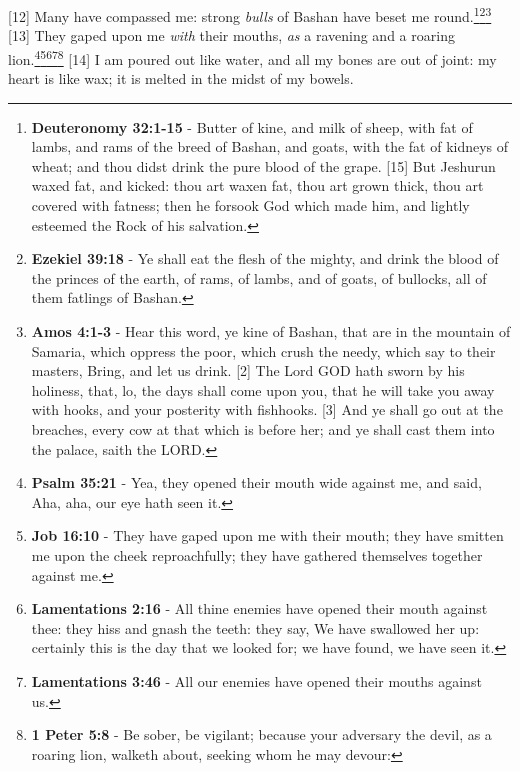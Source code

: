 [12] \textcolor[cmyk]{0.99998,1,0,0}{Many  have compassed me: strong \emph{bulls} of Bashan have beset me round.}\footnote{\textbf{Deuteronomy 32:1-15} - Butter of kine, and milk of sheep, with fat of lambs, and rams of the breed of Bashan, and goats, with the fat of kidneys of wheat; and thou didst drink the pure blood of the grape. [15] But Jeshurun waxed fat, and kicked: thou art waxen fat, thou art grown thick, thou art covered with fatness; then he forsook God which made him, and lightly esteemed the Rock of his salvation.}\footnote{\textbf{Ezekiel 39:18} - Ye shall eat the flesh of the mighty, and drink the blood of the princes of the earth, of rams, of lambs, and of goats, of bullocks, all of them fatlings of Bashan.}\footnote{\textbf{Amos 4:1-3} - Hear this word, ye kine of Bashan, that are in the mountain of Samaria, which oppress the poor, which crush the needy, which say to their masters, Bring, and let us drink. [2] The Lord GOD hath sworn by his holiness, that, lo, the days shall come upon you, that he will take you away with hooks, and your posterity with fishhooks. [3] And ye shall go out at the breaches, every cow at that which is before her; and ye shall cast them into the palace, saith the LORD.}
[13] \textcolor[cmyk]{0.99998,1,0,0}{They gaped upon me \emph{with} their mouths, \emph{as} a ravening and a roaring lion.}\footnote{\textbf{Psalm 35:21} - Yea, they opened their mouth wide against me, and said, Aha, aha, our eye hath seen it.}\footnote{\textbf{Job 16:10} - They have gaped upon me with their mouth; they have smitten me upon the cheek reproachfully; they have gathered themselves together against me.}\footnote{\textbf{Lamentations 2:16} - All thine enemies have opened their mouth against thee: they hiss and gnash the teeth: they say, We have swallowed her up: certainly this is the day that we looked for; we have found, we have seen it.}\footnote{\textbf{Lamentations 3:46} - All our enemies have opened their mouths against us.}\footnote{\textbf{1 Peter 5:8} - Be sober, be vigilant; because your adversary the devil, as a roaring lion, walketh about, seeking whom he may devour:}
[14] \textcolor[cmyk]{0.99998,1,0,0}{I am poured out like water, and all my bones are out of joint: my heart is like wax; it is melted in the midst of my bowels.}
